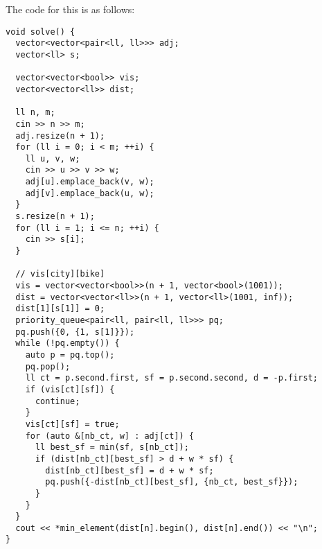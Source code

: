 \documentclass{article}
\begin{document}
The code for this is as follows:
\begin{verbatim}
void solve() {
  vector<vector<pair<ll, ll>>> adj;
  vector<ll> s;
 
  vector<vector<bool>> vis;
  vector<vector<ll>> dist;
 
  ll n, m;
  cin >> n >> m;
  adj.resize(n + 1);
  for (ll i = 0; i < m; ++i) {
    ll u, v, w;
    cin >> u >> v >> w;
    adj[u].emplace_back(v, w);
    adj[v].emplace_back(u, w);
  }
  s.resize(n + 1);
  for (ll i = 1; i <= n; ++i) {
    cin >> s[i];
  }
 
  // vis[city][bike]
  vis = vector<vector<bool>>(n + 1, vector<bool>(1001));
  dist = vector<vector<ll>>(n + 1, vector<ll>(1001, inf));
  dist[1][s[1]] = 0;
  priority_queue<pair<ll, pair<ll, ll>>> pq;
  pq.push({0, {1, s[1]}});
  while (!pq.empty()) {
    auto p = pq.top();
    pq.pop();
    ll ct = p.second.first, sf = p.second.second, d = -p.first;
    if (vis[ct][sf]) {
      continue;
    }
    vis[ct][sf] = true;
    for (auto &[nb_ct, w] : adj[ct]) {
      ll best_sf = min(sf, s[nb_ct]);
      if (dist[nb_ct][best_sf] > d + w * sf) {
        dist[nb_ct][best_sf] = d + w * sf;
        pq.push({-dist[nb_ct][best_sf], {nb_ct, best_sf}});
      }
    }
  }
  cout << *min_element(dist[n].begin(), dist[n].end()) << "\n";
}
\end{verbatim}
\end{document}

